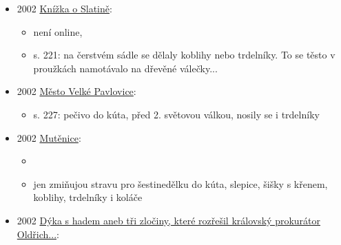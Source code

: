 \begin{itemize}
  \begin{itemize}
  \tightlist
  \item
    s. 296, Muzikanti okny neutíkají
  \item
    za války hráli muzikati v Krhovicích (u Znojma) a v bufetu byly
    trdelníky
  \end{itemize}
\item
  2002
  \href{https://ceskadigitalniknihovna.cz/uuid/uuid:b70d1490-9c83-11ed-b51a-005056827e52}{Knížka
  o Slatině}:

  \begin{itemize}
  \tightlist
  \item
    není online, 
  \item
    s. 221: na čerstvém sádle se dělaly koblihy nebo trdelníky. To se
    těsto v proužkách namotávalo na dřevěné válečky...
  \end{itemize}
\item
  2002
  \href{https://ceskadigitalniknihovna.cz/uuid/uuid:2f7b11a0-3d86-11ed-b06c-005056827e52}{Město
  Velké Pavlovice}:

  \begin{itemize}
  \tightlist
  \item
    s. 227: pečivo do kúta, před 2. světovou válkou, nosily se i
    trdelníky
  \end{itemize}
\item
  2002
  \href{https://www.digitalniknihovna.cz/mzk/uuid/uuid:6e4c3f50-08ab-11e7-9446-005056827e51}{Mutěnice}:

  \begin{itemize}
  \tightlist
  \item
     
  \item
    jen zmiňujou stravu pro šestinedělku do kúta, slepice, šišky s
    křenem, koblihy, trdelníky i koláče
  \end{itemize}
\item
  2002
  \href{https://www.digitalniknihovna.cz/mzk/uuid/uuid:084e4c90-5090-11e5-bf4b-005056827e51}{Dýka
  s hadem aneb tři zločiny, které rozřešil královský prokurátor
  Oldřich...}:


\end{itemize}

